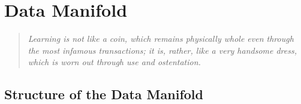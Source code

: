 \documentclass[../main.tex]{subfiles}
\begin{document}
\chapter{Data Manifold}\label{chap:data_manifold}


\begin{quote}
    \emph{Learning is not like a coin, which remains physically whole even through the most infamous transactions; it is, rather, like a very handsome dress, which is worn out through use and ostentation.}\\
  \end{quote}

\cleardoublepage%



\section{Structure of the Data Manifold}









\end{document}

